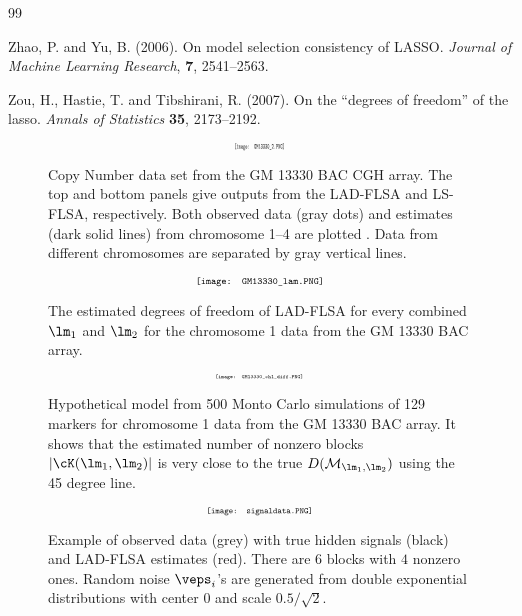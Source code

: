 \documentclass[12pt]{article}
\begin{document}
\begin{thebibliography} {99}
\item
 Zhao, P. and Yu, B. (2006).
On model selection consistency of LASSO. \emph{Journal of Machine
Learning Research}, \textbf{7}, 2541--2563.

\item Zou, H., Hastie, T. and Tibshirani, R. (2007). On the ``degrees
of freedom'' of  the lasso. \emph{Annals of Statistics} {\bf 35},
2173--2192.



\end{thebibliography}


\newpage
\begin{figure}[htp]
\centering
 $$\scalebox{0.3}[0.5]{\texttt{[image: GM13330\_2.PNG]}}$$
\caption{Copy Number data set from the GM 13330  BAC CGH array. The top and bottom panels give
outputs from the LAD-FLSA and LS-FLSA, respectively.
Both observed data (gray dots) and estimates (dark solid lines) from chromosome 1--4 are plotted .
Data from different chromosomes are separated by gray vertical lines. }\label{fig:signal example}
\end{figure}

\begin{figure}[htp]
\centering
 $$\scalebox{0.7}[0.7]{\texttt{[image: GM13330\_lam.PNG]}}$$
\caption{The estimated degrees of freedom of LAD-FLSA
for every combined $\lm_1$ and $\lm_2$ for the
 chromosome 1 data from the GM 13330 BAC array.
}\label{fig:signal example}
\end{figure}

\begin{figure}[htp]
\centering
$$\scalebox{0.4}[0.4]{\texttt{[image: GM13330\_ch1\_diff.PNG]}}$$
\caption{Hypothetical model from 500 Monto Carlo simulations of 129
markers for chromosome 1  data from the GM 13330 BAC array. It shows
that the estimated number of nonzero blocks $|\cK(\lm_1,\lm_2)|$
 is very close to the true $D(\mathcal{M}_{\lm_1,
\lm_2})$ using the 45 degree line.}\label{fig:CGHdf}
\end{figure}

\begin{figure}[htp]
\centering
$$\scalebox{0.6}[0.6]{\texttt{[image: signaldata.PNG]}}$$
\caption{Example of observed data (grey) with true hidden signals
 (black) and LAD-FLSA estimates (red). There are $6$ blocks
 with $4$ nonzero ones. Random noise $\veps_i$'s are generated
  from double exponential distributions with center $0$ and
  scale $0.5/\sqrt{2}$. }\label{fig:signaldata}
\end{figure}
\end{document}
